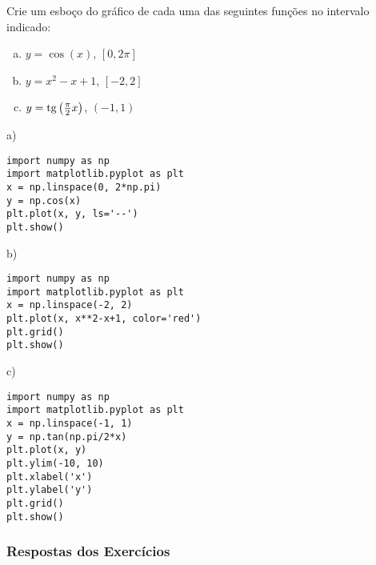 \begin{exer}
  Crie um esboço do gráfico de cada uma das seguintes funções no intervalo indicado:
  \begin{enumerate}[a)]
  \item $y = \cos(x)$, $\left[0, 2\pi\right]$
  \item $y = x^2 - x + 1$, $[-2, 2]$
  \item $y = \operatorname{tg}\left(\frac{\pi}{2}x\right)$, $(-1, 1)$
  \end{enumerate}
\end{exer}
\begin{resp}

a)

\begin{lstlisting}
import numpy as np
import matplotlib.pyplot as plt
x = np.linspace(0, 2*np.pi)
y = np.cos(x)
plt.plot(x, y, ls='--')
plt.show()
\end{lstlisting}

b)

\begin{lstlisting}
import numpy as np
import matplotlib.pyplot as plt
x = np.linspace(-2, 2)
plt.plot(x, x**2-x+1, color='red')
plt.grid()
plt.show()
\end{lstlisting}

c)

\begin{lstlisting}
import numpy as np
import matplotlib.pyplot as plt
x = np.linspace(-1, 1)
y = np.tan(np.pi/2*x)
plt.plot(x, y)
plt.ylim(-10, 10)
plt.xlabel('x')
plt.ylabel('y')
plt.grid()
plt.show()
\end{lstlisting}

\end{resp}

\ifisbook 
\subsubsection*{Respostas dos Exercícios}
\shipoutAnswer
\fi

